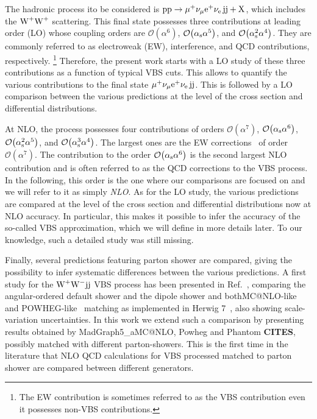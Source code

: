 The hadronic process ito be considered is $\text{p}\text{p}\to\mu^+\nu_\mu{\rm e}^+\nu_{\rm e}\,\text{j}\text{j}+\mathrm{X}$, which includes the $\text{W}^+\text{W}^+$ scattering.
This final state possesses three contributions at leading order (LO) whose coupling orders are $\mathcal{O}{\left(\alpha^{6}\right)}$, $\mathcal{O}{\left(\alpha_{\rm s}\alpha^{5}\right)}$, and $\mathcal{O}{\left(\alpha_\text{s}^{2}\alpha^{4}\right)}$.
They are commonly referred to as electroweak (EW), interference, and QCD contributions, respectively.%
\footnote{The EW contribution is sometimes referred to as the VBS contribution even it possesses non-VBS contributions.}
Therefore, the present work starts with a LO study of these three contributions as a function of typical VBS cuts.
This allows to quantify the various contributions to the final state $\mu^+\nu_\mu{\rm e}^+\nu_{\rm e}\,\text{j}\text{j}$.
This is followed by a LO comparison between the various predictions at the level of the cross section and differential distributions.

At NLO, the process possesses four contributions of orders $\mathcal{O}{\left(\alpha^{7}\right)}$, $\mathcal{O}{\left(\alpha_\text{s}\alpha^{6}\right)}$, $\mathcal{O}{\left(\alpha_\text{s}^{2}\alpha^{5}\right)}$, and $\mathcal{O}{\left(\alpha_\text{s}^{3}\alpha^{4}\right)}$.
The largest ones are the EW corrections~\cite{Biedermann:2017bss,Biedermann:2016yds} of order $\mathcal{O}{\left(\alpha^{7}\right)}$.
The contribution to the order $\mathcal{O}{\left(\alpha_\text{s}\alpha^{6}\right)}$ is the second largest NLO contribution and is often referred to as the QCD corrections to the VBS process.
In the following, this order is the one where our comparisons are focused on and we will refer to it as simply \emph{NLO}.
As for the LO study, the various predictions are compared at the level of the cross section and differential distributions now at NLO accuracy.
In particular, this makes it possible to infer the accuracy of the so-called VBS approximation, which we will define in more details later.
To our knowledge, such a detailed study was still missing.

Finally, several predictions featuring parton shower are compared, giving the possibility to infer systematic differences between the various predictions.
A first study for the $\text{W}^+ \text{W}^- \text{j} \text{j}$ VBS process has been presented in
Ref.~\cite{Rauch:2016upa}, comparing the angular-ordered default shower and the dipole
shower and both{\sc MC@NLO}-like~\cite{Frixione:2002ik} and {\sc POWHEG}-like~\cite{Nason:2004rx,Frixione:2007vw} matching as implemented
in {\sc Herwig 7}~\cite{Bellm:2015jjp}, also showing scale-variation uncertainties. In this work we extend such a comparison by presenting 
results obtained by {\sc MadGraph5\_aMC@NLO}, {\sc Powheg} and {\sc Phantom} {\bf CITES}, possibly matched with different parton-showers.
This is the first time in the literature that NLO QCD calculations for VBS processed matched to parton shower are compared between different generators.

